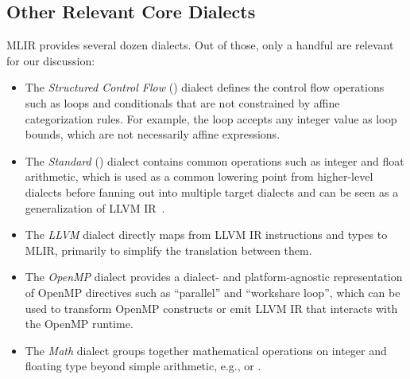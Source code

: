 \subsection{Other Relevant Core Dialects}
MLIR  provides several dozen dialects.
Out of those, only a handful are relevant for our discussion:
\begin{itemize}
\item
The \emph{Structured Control Flow} () dialect defines the control flow operations such as loops and conditionals that are not constrained by affine categorization rules.
For example, the  loop accepts any integer value as loop bounds, which are not necessarily affine expressions.
\item
The \emph{Standard} () dialect contains common operations such as integer and float arithmetic, which is used as a common lowering point from higher-level dialects before fanning out into multiple target dialects and can be seen as a generalization of LLVM IR~\cite{llvm}.
\item
The \emph{LLVM} dialect directly maps from LLVM IR instructions and types to MLIR, primarily to simplify the translation between them.
\item
The \emph{OpenMP} dialect provides a dialect- and platform-agnostic representation of OpenMP directives such as ``parallel'' and ``workshare loop'', which can be used to transform OpenMP constructs or emit LLVM IR that interacts with the OpenMP runtime.
\item
The \emph{Math} dialect groups together mathematical operations on integer and floating type beyond simple arithmetic, e.g.,  or .
\end{itemize}